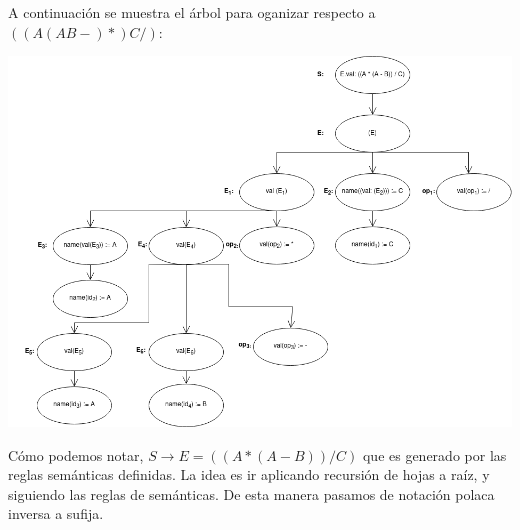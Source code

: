A continuación se muestra el árbol para oganizar  respecto a $((A (A B -) *) C /)$:
\begin{center}
        \includegraphics[width=.85\textwidth]{./02.png}
\end{center}
Cómo podemos notar, $S \rightarrow E = ((A * (A - B)) / C)$ que es generado por las reglas semánticas definidas. La
idea es ir aplicando recursión de hojas a raíz, y siguiendo las reglas de semánticas. De esta manera pasamos de
notación polaca inversa a sufija.
